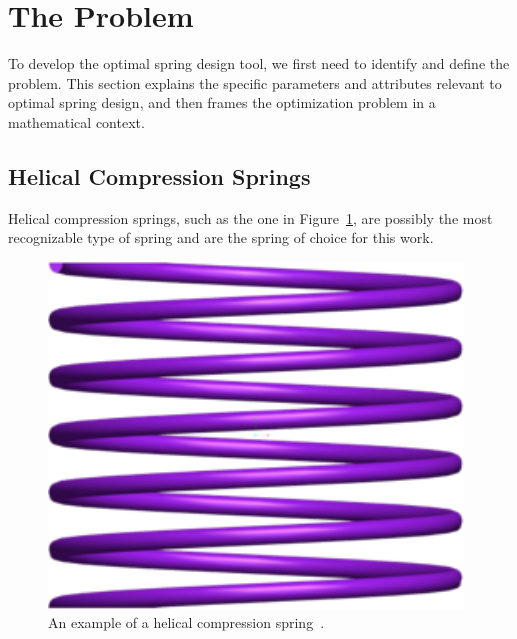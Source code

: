 \documentclass[10pt]{article}
\begin{document}
\section{The Problem} 
\label{sec:The_Problem}

To develop the optimal spring design tool, we first need to identify and define the problem. This section explains the specific parameters and attributes relevant to optimal spring design, and then frames the optimization problem in a mathematical context.

\subsection{Helical Compression Springs}
\label{sec:Springs}

Helical compression springs, such as the one in Figure~\ref{fig:Spring}, are possibly the most recognizable type of spring and are the spring of choice for this work. 

		\begin{figure}[h]
		 \begin{center}\includegraphics[scale=.2]{Spring.png}\end{center}
		 \caption{An example of a helical compression spring~\cite{Massad2015}.}
		 \label{fig:Spring}
		 
		 \end{figure}
\end{document}
